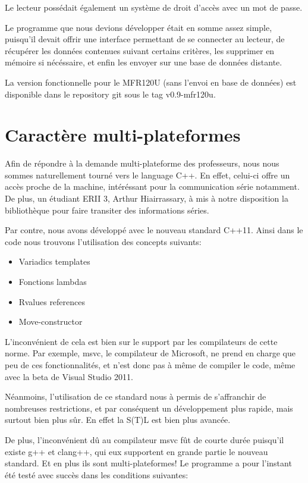 Le lecteur possédait également un système de droit d'accès avec un mot de passe.

Le programme que nous devions développer était en somme assez simple, puisqu'il
devait offrir une interface permettant de se connecter au lecteur, de récupérer les
données contenues suivant certains critères, les supprimer en mémoire si nécéssaire,
et enfin les envoyer sur une base de données distante.

La version fonctionnelle pour le MFR120U (sans l'envoi en base de données)
est disponible dans le repository git sous le tag v0.9-mfr120u.

        \section{Caractère multi-plateformes}

Afin de répondre à la demande multi-plateforme des professeurs, nous nous 
sommes naturellement tourné vers le language C++. En effet, celui-ci offre un accès
proche de la machine, intéréssant pour la communication série notamment. De plus,
un étudiant ERII 3, Arthur Hiairrassary, à mis à notre disposition la bibliothèque
pour faire transiter des informations séries.

Par contre, nous avons développé avec le nouveau standard C++11. Ainsi
dans le code nous trouvons l'utilisation des concepts suivants:

    \begin{itemize}
    \item Variadics templates
    \item Fonctions lambdas
    \item Rvalues references
    \item Move-constructor
    \end{itemize}

L'inconvénient de cela est bien sur le support par les compilateurs de cette
norme. Par exemple, msvc, le compilateur de Microsoft, ne prend en charge que peu
de ces fonctionnalités, et n'est donc pas à même de compiler le code, même avec la
beta de Visual Studio 2011.

Néanmoins, l'utilisation de ce standard nous à permis de s'affranchir de nombreuses
restrictions, et par conséquent un développement plus rapide, mais surtout bien
plus sûr. En effet la S(T)L est bien plus avancée.

De plus, l'inconvénient dû au compilateur msvc fût de courte durée puisqu'il
existe g++ et clang++, qui eux supportent en grande partie le nouveau standard.
Et en plus ils sont multi-plateformes! Le programme a pour l'instant été testé 
avec succès dans les conditions suivantes:

